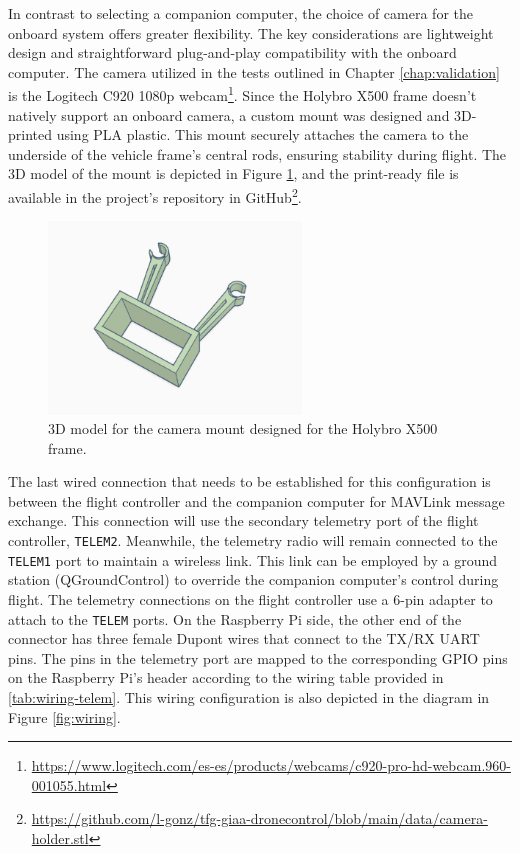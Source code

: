 In contrast to selecting a companion computer, the choice of camera for the onboard system offers greater flexibility. The key considerations are lightweight design and straightforward plug-and-play compatibility with the onboard computer. The camera utilized in the tests outlined in Chapter \ref{chap:validation} is the Logitech C920 1080p webcam\footnote{\url{https://www.logitech.com/es-es/products/webcams/c920-pro-hd-webcam.960-001055.html}}. Since the Holybro X500 frame doesn't natively support an onboard camera, a custom mount was designed and 3D-printed using PLA plastic. This mount securely attaches the camera to the underside of the vehicle frame's central rods, ensuring stability during flight. The 3D model of the mount is depicted in Figure \ref{fig:camera-holder-3d}, and the print-ready file is available in the project's repository in GitHub\footnote{\url{https://github.com/l-gonz/tfg-giaa-dronecontrol/blob/main/data/camera-holder.stl}}.

\begin{figure}
  \centering
  \includegraphics[width=0.6\textwidth, keepaspectratio]{img/cam-holder.jpg}
  \caption{3D model for the camera mount designed for the Holybro X500 frame.}
  \label{fig:camera-holder-3d}
\end{figure}

The last wired connection that needs to be established for this configuration is between the flight controller and the companion computer for MAVLink message exchange.
This connection will use the secondary telemetry port of the flight controller, \texttt{TELEM2}.
Meanwhile, the telemetry radio will remain connected to the \texttt{TELEM1} port to maintain a wireless link.
This link can be employed by a ground station (QGroundControl) to override the companion computer's control during flight.
The telemetry connections on the flight controller use a 6-pin adapter to attach to the \texttt{TELEM} ports.
On the Raspberry Pi side, the other end of the connector has three female Dupont wires that connect to the TX/RX UART pins. The pins in the telemetry port are mapped to the corresponding GPIO pins on the Raspberry Pi's header according to the wiring table provided in \ref{tab:wiring-telem}.
This wiring configuration is also depicted in the diagram in Figure \ref{fig:wiring}.


